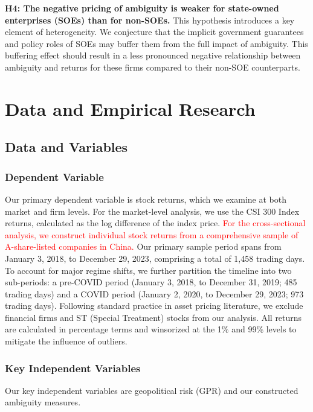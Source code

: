 \documentclass[preprint,12pt,authoryear]{elsarticle}
\begin{document}
\textbf{H4: The negative pricing of ambiguity is weaker for state-owned enterprises (SOEs) than for non-SOEs.}
This hypothesis introduces a key element of heterogeneity. We conjecture that the implicit government guarantees and policy roles of SOEs may buffer them from the full impact of ambiguity. This buffering effect should result in a less pronounced negative relationship between ambiguity and returns for these firms compared to their non-SOE counterparts.


\section{Data and Empirical Research}
\label{sec:data}

\subsection{Data and Variables}

\subsubsection{Dependent Variable}

Our primary dependent variable is stock returns, which we examine at both market and firm levels. For the market-level analysis, we use the CSI 300 Index returns, calculated as the log difference of the index price. \textcolor{red}{For the cross-sectional analysis, we construct individual stock returns from a comprehensive sample of A-share-listed companies in China.} Our primary sample period spans from January 3, 2018, to December 29, 2023, comprising a total of 1,458 trading days. To account for major regime shifts, we further partition the timeline into two sub-periods: a pre-COVID period (January 3, 2018, to December 31, 2019; 485 trading days) and a COVID period (January 2, 2020, to December 29, 2023; 973 trading days). Following standard practice in asset pricing literature, we exclude financial firms and ST (Special Treatment) stocks from our analysis. All returns are calculated in percentage terms and winsorized at the 1\% and 99\% levels to mitigate the influence of outliers.



\subsubsection{Key Independent Variables}

Our key independent variables are geopolitical risk (GPR) and our constructed ambiguity measures.
\end{document}
